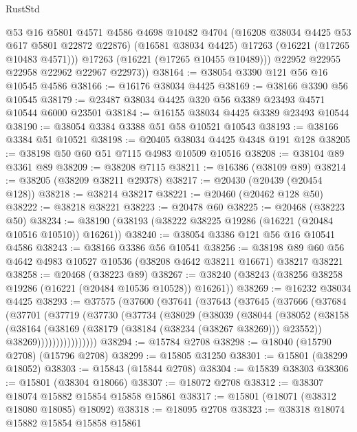 \begin{lexlean}{RustStd}
\begin{coremodule}
            @53
            @16
            @5801
            @4571
            @4586
            @4698
            @10482
            @4704
            (@16208 @38034 @4425 @53 @617 @5801 @22872 @22876)
            (@16581 @38034 @4425)
            @17263
            (@16221 (@17265 @10483 @4571)))
          @17263
          (@16221 (@17265 @10455 @10489)))
        @22952
        @22955
        @22958
        @22962
        @22967
        @22973))
@38164 := @38054 @3390 @121 @56 @16 @10545 @4586
@38166 := @16176 @38034 @4425
@38169 := @38166 @3390 @56 @10545
@38179 := @23487 @38034 @4425 @320 @56 @3389 @23493 @4571 @10544 @6000 @23501
@38184 := @16155 @38034 @4425 @3389 @23493 @10544
@38190 := @38054 @3384 @3388 @51 @58 @10521 @10543
@38193 := @38166 @3384 @51 @10521
@38198 := @20405 @38034 @4425 @4348 @191 @128
@38205 := @38198 @50 @60 @51 @7115 @4983 @10509 @10516
@38208 := @38104 @89 @3361 @89
@38209 := @38208 @7115
@38211 := @16386 (@38109 @89)
@38214 := @38205 (@38209 @38211 @29378)
@38217 := @20430 (@20439 (@20454 @128))
@38218 := @38214 @38217
@38221 := @20460 (@20462 @128 @50)
@38222 := @38218 @38221
@38223 := @20478 @60
@38225 := @20468 (@38223 @50)
@38234 := @38190 (@38193 (@38222 @38225 @19286 (@16221 (@20484 @10516 @10510)) @16261))
@38240 := @38054 @3386 @121 @56 @16 @10541 @4586
@38243 := @38166 @3386 @56 @10541
@38256 := @38198 @89 @60 @56 @4642 @4983 @10527 @10536 (@38208 @4642 @38211 @16671) @38217 @38221
@38258 := @20468 (@38223 @89)
@38267 := @38240 (@38243 (@38256 @38258 @19286 (@16221 (@20484 @10536 @10528)) @16261))
@38269 := @16232 @38034 @4425
@38293 := @37575
    (@37600
      (@37641
        (@37643
          (@37645
            (@37666
              (@37684
                (@37701
                  (@37719
                    (@37730
                      (@37734
                        (@38029
                          (@38039
                            (@38044
                              (@38052
                                (@38158
                                  (@38164
                                    (@38169 (@38179 (@38184 (@38234 (@38267 @38269))) @23552))
                                    @38269))))))))))))))))
@38294 := @15784 @2708
@38298 := @18040 (@15790 @2708) (@15796 @2708)
@38299 := @15805 @31250
@38301 := @15801 (@38299 @18052)
@38303 := @15843 (@15844 @2708)
@38304 := @15839 @38303
@38306 := @15801 (@38304 @18066)
@38307 := @18072 @2708
@38312 := @38307 @18074 @15882 @15854 @15858 @15861
@38317 := @15801 (@18071 (@38312 @18080 @18085) @18092)
@38318 := @18095 @2708
@38323 := @38318 @18074 @15882 @15854 @15858 @15861

\end{coremodule}
\end{lexlean}

